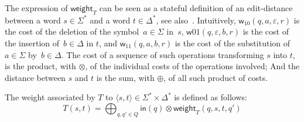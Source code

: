 \documentclass[runningheads]{llncs}
\def\endex{\hspace*{\fill} $\Diamond$\smallskip }
{\theorembodyfont{\rmfamily} \theoremstyle{break} \newtheorem{algo}{Algorithm}}
\def\<#1>{\langle #1 \rangle}
\newcommand{\Semiring}{\mathbb{S}}
\def\SWT{\textsf{swT}\xspace}
\def\weight{\mathsf{weight}}
\def\wei{\mathsf{w}}
\begin{document}
%

The expression of $\weight_T$ can be seen as a stateful definition of 
an edit-distance between a word $s \in \Sigma^*$ and a word $t \in \Delta^*$,
see also~\cite{Mohri03ijfcs}.
Intuitively, 
$\wei_{10}(q, a, \varepsilon, r)$ is the cost of 
the deletion of the symbol~$a \in \Sigma$ in~$s$, 
$\wei{01}(q, \varepsilon, b, r)$ is the cost 
of the insertion of~$b \in \Delta$ in $t$, 
and $\wei_{11}(q, a, b, r)$ is the cost 
of the substitution of  $a \in \Sigma$ by~$b \in \Delta$.
%
The cost of a sequence of such operations transforming $s$ into $t$, 
is the product, with $\otimes$, of the individual costs of the operations involved;
And the distance between $s$ and $t$ is the sum, with $\oplus$,
of all such product of costs.

\medskip\noindent
The weight associated by $T$ to $\< s, t> \in \Sigma^* \times \Delta^*$
is defined as follows:
\begin{equation}
T(s, t)  = 
\displaystyle\bigoplus_{q, q' \in Q} \mathsf{in}(q) 
\mathop{\otimes} \weight_T(q, s, t, q') %
\label{eq:SWT-value}
\end{equation}

%
\end{document}
